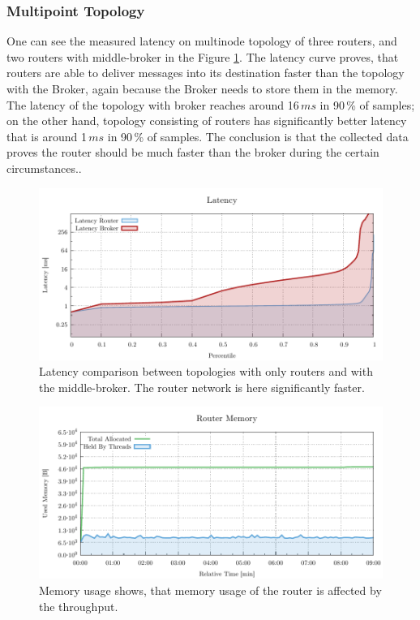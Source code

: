 \subsubsection*{Multipoint Topology}
One can see the measured latency on multinode topology of three routers, and two routers with middle-broker in the Figure \ref{fig:latency-multipoint-router}. The latency curve proves, that routers are able to deliver messages into its destination faster than the topology with the Broker, again because the Broker needs to store them in the memory. The latency of the topology with broker reaches around 16\,$ms$ in 90\,\% of samples; on the other hand, topology consisting of routers has significantly better latency that is around 1\,$ms$ in 90\,\% of samples. The conclusion is that the collected data proves the router should be much faster than the broker during the certain circumstances..

\begin{figure}[H]
	\centering
	\includegraphics[width=1\linewidth]{obrazky-figures/charts/multipoint-latency.pdf}
	\caption{Latency comparison between topologies with only routers and with the middle-broker. The router network is here significantly faster.}
	\label{fig:latency-multipoint-router}
\end{figure}

\begin{figure}[H]
	\centering
	\includegraphics[width=1\linewidth]{obrazky-figures/charts/multipoint-router-only-latency-memory.pdf}
	\caption{Memory usage shows, that memory usage of the router is affected by the throughput.}
	\label{fig:latency-multiple-router-memory}
\end{figure}

